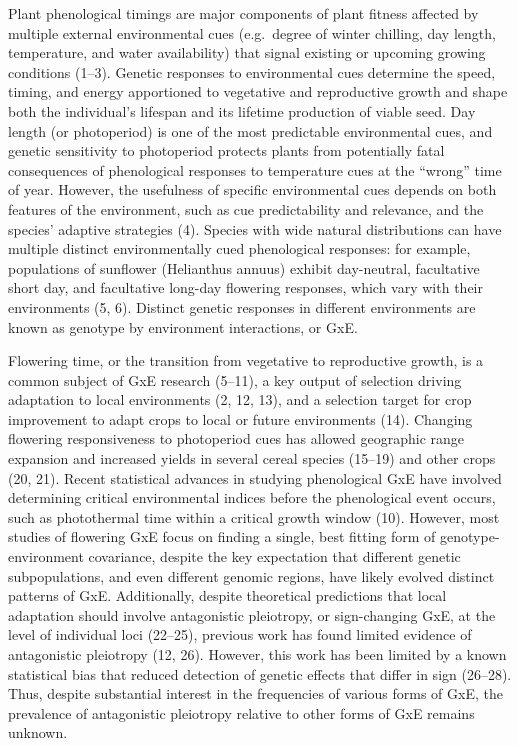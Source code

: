 \documentclass[
  9pt,
  twocolumn,
  twoside]{pnas-new}
\begin{document}
Plant phenological timings are major components of plant fitness
affected by multiple external environmental cues (e.g.~degree of winter
chilling, day length, temperature, and water availability) that signal
existing or upcoming growing conditions (1--3). Genetic responses to
environmental cues determine the speed, timing, and energy apportioned
to vegetative and reproductive growth and shape both the individual's
lifespan and its lifetime production of viable seed. Day length (or
photoperiod) is one of the most predictable environmental cues, and
genetic sensitivity to photoperiod protects plants from potentially
fatal consequences of phenological responses to temperature cues at the
``wrong'' time of year. However, the usefulness of specific
environmental cues depends on both features of the environment, such as
cue predictability and relevance, and the species' adaptive strategies
(4). Species with wide natural distributions can have multiple distinct
environmentally cued phenological responses: for example, populations of
sunflower (Helianthus annuus) exhibit day-neutral, facultative short
day, and facultative long-day flowering responses, which vary with their
environments (5, 6). Distinct genetic responses in different
environments are known as genotype by environment interactions, or GxE.

Flowering time, or the transition from vegetative to reproductive
growth, is a common subject of GxE research (5--11), a key output of
selection driving adaptation to local environments (2, 12, 13), and a
selection target for crop improvement to adapt crops to local or future
environments (14). Changing flowering responsiveness to photoperiod cues
has allowed geographic range expansion and increased yields in several
cereal species (15--19) and other crops (20, 21). Recent statistical
advances in studying phenological GxE have involved determining critical
environmental indices before the phenological event occurs, such as
photothermal time within a critical growth window (10). However, most
studies of flowering GxE focus on finding a single, best fitting form of
genotype-environment covariance, despite the key expectation that
different genetic subpopulations, and even different genomic regions,
have likely evolved distinct patterns of GxE. Additionally, despite
theoretical predictions that local adaptation should involve
antagonistic pleiotropy, or sign-changing GxE, at the level of
individual loci (22--25), previous work has found limited evidence of
antagonistic pleiotropy (12, 26). However, this work has been limited by
a known statistical bias that reduced detection of genetic effects that
differ in sign (26--28). Thus, despite substantial interest in the
frequencies of various forms of GxE, the prevalence of antagonistic
pleiotropy relative to other forms of GxE remains unknown.
\end{document}
